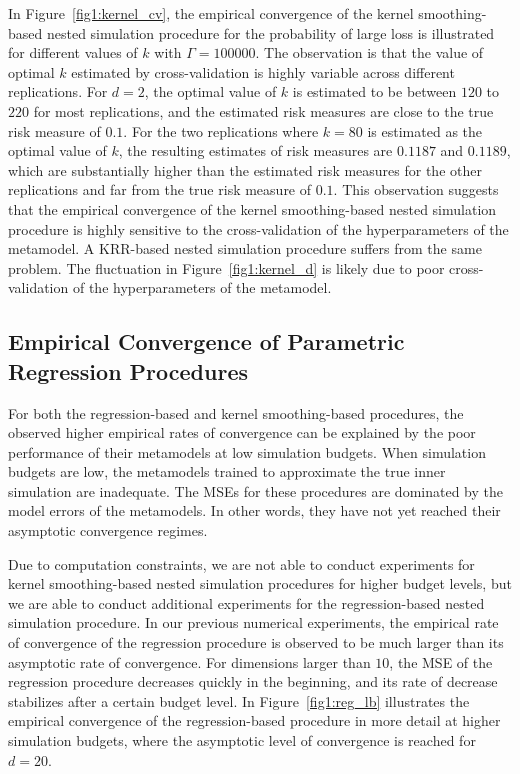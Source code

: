 In Figure~\ref{fig1:kernel_cv}, the empirical convergence of the kernel smoothing-based nested simulation procedure for the probability of large loss is illustrated for different values of $k$ with $\Gamma = \num{100000}$.
The observation is that the value of optimal $k$ estimated by cross-validation is highly variable across different replications.
For $d = 2$, the optimal value of $k$ is estimated to be between $120$ to $220$ for most replications, and the estimated risk measures are close to the true risk measure of $0.1$.
For the two replications where $k = 80$ is estimated as the optimal value of $k$, the resulting estimates of risk measures are $0.1187$ and $0.1189$, which are substantially higher than the estimated risk measures for the other replications and far from the true risk measure of $0.1$.
This observation suggests that the empirical convergence of the kernel smoothing-based nested simulation procedure is highly sensitive to the cross-validation of the hyperparameters of the metamodel.
A KRR-based nested simulation procedure suffers from the same problem. 
The fluctuation in Figure~\ref{fig1:kernel_d} is likely due to poor cross-validation of the hyperparameters of the metamodel.

\subsection{Empirical Convergence of Parametric Regression Procedures} \label{sec1:regression-convergence}

For both the regression-based and kernel smoothing-based procedures, the observed higher empirical rates of convergence can be explained by the poor performance of their metamodels at low simulation budgets. 
When simulation budgets are low, the metamodels trained to approximate the true inner simulation are inadequate.
The MSEs for these procedures are dominated by the model errors of the metamodels.
In other words, they have not yet reached their asymptotic convergence regimes.

Due to computation constraints, we are not able to conduct experiments for kernel smoothing-based nested simulation procedures for higher budget levels, but we are able to conduct additional experiments for the regression-based nested simulation procedure.
In our previous numerical experiments, the empirical rate of convergence of the regression procedure is observed to be much larger than its asymptotic rate of convergence.
For dimensions larger than $10$, the MSE of the regression procedure decreases quickly in the beginning, and its rate of decrease stabilizes after a certain budget level.
In Figure~\ref{fig1:reg_lb} illustrates the empirical convergence of the regression-based procedure in more detail at higher simulation budgets, where the asymptotic level of convergence is reached for $d = 20$.

